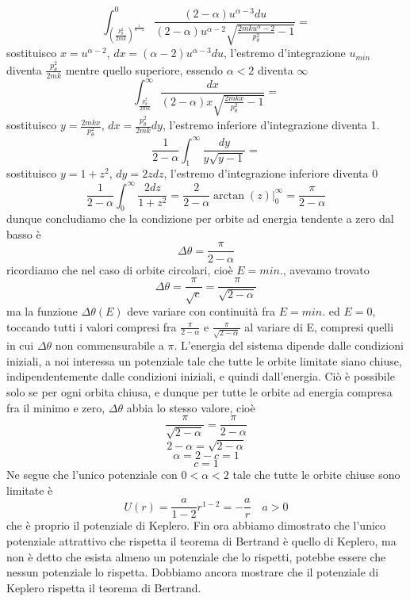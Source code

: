 \documentclass[
10pt, %
a4paper, %
oneside, %
headinclude,footinclude, %
BCOR5mm, %
]{scrartcl}
\begin{document}
\[\int_{\left(\frac{p_\theta^2}{2mk}\right)^{\frac{1}{\alpha - 2}}}^{0}\frac{(2-\alpha)u^{\alpha-3}du}{(2-\alpha)u^{\alpha-2}\sqrt{\frac{2mku^{\alpha}-2}{p_\theta^2}-1}}=\]
sostituisco \(x = u^{\alpha-2}\), \(dx = (\alpha - 2)u^{\alpha -3}du\), l'estremo d'integrazione \(u_{min}\) diventa \(\frac{p_\theta^2}{2mk}\) mentre quello superiore, essendo \(\alpha < 2\) diventa $\infty$
\[\int_{\frac{p_\theta^2}{2mk}}^{\infty}\frac{dx}{(2-\alpha)x\sqrt{\frac{2mkx}{p_\theta^2}-1}}=\]
sostituisco \(y = \frac{2mkx}{p_\theta^2}\), \(dx = \frac{p_\theta^2}{2mk}dy\), l'estremo inferiore d'integrazione diventa 1.
\[\frac{1}{2-\alpha}\int_{1}^{\infty}\frac{dy}{y\sqrt{y-1}}=\]
sostituisco \(y = 1+z^2\), \(dy = 2zdz\), l'estremo d'integrazione inferiore diventa 0
\[\frac{1}{2-\alpha}\int_{0}^{\infty}\frac{2dz}{{1+z^2}}=\frac{2}{2-\alpha}\arctan(z)|^\infty_0 = \frac{\pi}{2-\alpha}\]
dunque concludiamo che la condizione per orbite ad energia tendente a zero dal basso è
\[\Delta\theta = \frac{\pi}{2-\alpha}\]
ricordiamo che nel caso di orbite circolari, cioè \(E = min.\), avevamo trovato
\[\Delta\theta = \frac{\pi}{\sqrt{c}} = \frac{\pi}{\sqrt{2-\alpha}}\]
ma la funzione $\Delta\theta(E)$ deve variare con continuità fra \(E = min.\) ed \(E = 0\), toccando tutti i valori compresi fra \(\frac{\pi}{2-\alpha}\) e \(\frac{\pi}{\sqrt{2-\alpha}}\) al variare di E, compresi quelli in cui $\Delta\theta$ non commensurabile a \(\pi\). L'energia del sistema dipende dalle condizioni iniziali, a noi interessa un potenziale tale che tutte le orbite limitate siano chiuse, indipendentemente dalle condizioni iniziali, e quindi dall'energia. Ciò è possibile solo se per ogni orbita chiusa, e dunque per tutte le orbite ad energia compresa fra il minimo e zero, $\Delta\theta$ abbia lo stesso valore, cioè
\[\frac{\pi}{\sqrt{2-\alpha}} = \frac{\pi}{2-\alpha}\]
\[2-\alpha = \sqrt{2-\alpha}\]
\[\alpha= 2-c = 1\]
\[c = 1\]
Ne segue che l'unico potenziale con \(0<\alpha<2\) tale che tutte le orbite chiuse sono limitate è
\[U(r) = \frac{a}{1-2}r^{1-2} = -\frac{a}{r} \quad a>0\]
che è proprio il potenziale di Keplero.
Fin ora abbiamo dimostrato che l'unico potenziale attrattivo che rispetta il teorema di Bertrand è quello di Keplero, ma non è detto che esista almeno un potenziale che lo rispetti, potebbe essere che nessun potenziale lo rispetta. Dobbiamo ancora mostrare che il potenziale di Keplero rispetta il teorema di Bertrand.
\end{document}
